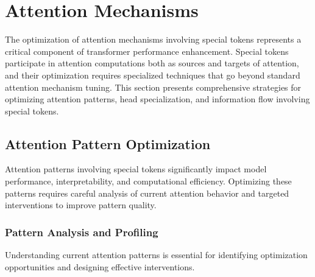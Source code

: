 
\section{Attention Mechanisms}

The optimization of attention mechanisms involving special tokens represents a critical component of transformer performance enhancement. Special tokens participate in attention computations both as sources and targets of attention, and their optimization requires specialized techniques that go beyond standard attention mechanism tuning. This section presents comprehensive strategies for optimizing attention patterns, head specialization, and information flow involving special tokens.

\subsection{Attention Pattern Optimization}

Attention patterns involving special tokens significantly impact model performance, interpretability, and computational efficiency. Optimizing these patterns requires careful analysis of current attention behavior and targeted interventions to improve pattern quality.

\subsubsection{Pattern Analysis and Profiling}

Understanding current attention patterns is essential for identifying optimization opportunities and designing effective interventions.

